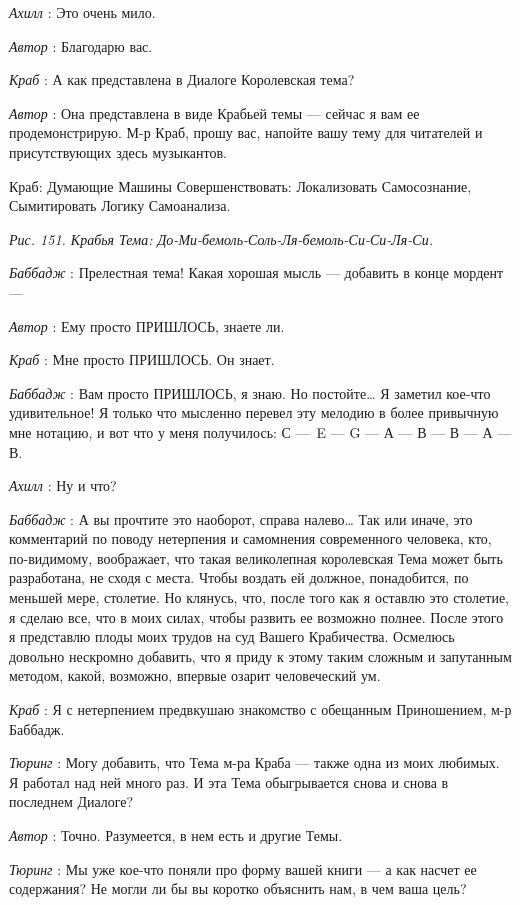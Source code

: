 \documentclass[../main.tex]{subfiles}
\begin{document}
\begin{dialogue}
\emph{Ахилл} : Это очень мило.

\emph{Автор} : Благодарю вас.

\emph{Краб} : А как представлена в Диалоге Королевская тема?

\emph{Автор} : Она представлена в виде Крабьей темы --- сейчас я вам ее продемонстрирую. М-р Краб, прошу вас, напойте вашу тему для читателей и присутствующих здесь музыкантов.

Краб: Думающие Машины Совершенствовать: Локализовать Самосознание, Сымитировать Логику Самоанализа.

\emph{Рис. 151. Крабья Тема: До-Ми-бемоль-Соль-Ля-бемоль-Си-Си-Ля-Си.}

\emph{Баббадж} : Прелестная тема! Какая хорошая мысль --- добавить в конце мордент ---

\emph{Автор} : Ему просто ПРИШЛОСЬ, знаете ли.

\emph{Краб} : Мне просто ПРИШЛОСЬ. Он знает.

\emph{Баббадж} : Вам просто ПРИШЛОСЬ, я знаю. Но постойте\ldots{} Я заметил кое-что удивительное! Я только что мысленно перевел эту мелодию в более привычную мне нотацию, и вот что у меня получилось: С ---~E --- G --- А --- В --- В --- А --- В.

\emph{Ахилл} : Ну и что?

\emph{Баббадж} : А вы прочтите это наоборот, справа налево\ldots{} Так или иначе, это комментарий по поводу нетерпения и самомнения современного человека, кто, по-видимому, воображает, что такая великолепная королевская Тема может быть разработана, не сходя с места. Чтобы воздать ей должное, понадобится, по меньшей мере, столетие. Но клянусь, что, после того как я оставлю это столетие, я сделаю все, что в моих силах, чтобы развить ее возможно полнее. После этого я представлю плоды моих трудов на суд Вашего Крабичества. Осмелюсь довольно нескромно добавить, что я приду к этому таким сложным и запутанным методом, какой, возможно, впервые озарит человеческий ум.

\emph{Краб} : Я с нетерпением предвкушаю знакомство с обещанным Приношением, м-р Баббадж.

\emph{Тюринг} : Могу добавить, что Тема м-ра Краба --- также одна из моих любимых. Я работал над ней много раз. И эта Тема обыгрывается снова и снова в последнем Диалоге?

\emph{Автор} : Точно. Разумеется, в нем есть и другие Темы.

\emph{Тюринг} : Мы уже кое-что поняли про форму вашей книги --- а как насчет ее содержания? Не могли ли бы вы коротко объяснить нам, в чем ваша цель?


\end{dialogue}
\end{document}
